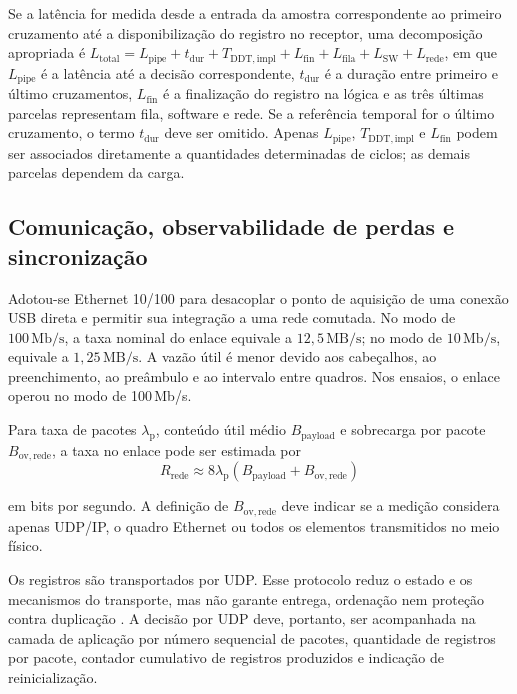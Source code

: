Se a latência for medida desde a entrada da amostra correspondente ao primeiro cruzamento até a disponibilização do registro no receptor, uma decomposição apropriada é \(L_{\mathrm{total}} = L_{\mathrm{pipe}} + t_{\mathrm{dur}} + T_{\mathrm{DDT,impl}} + L_{\mathrm{fin}} + L_{\mathrm{fila}} + L_{\mathrm{SW}} + L_{\mathrm{rede}}\), em que \(L_{\mathrm{pipe}}\) é a latência até a decisão correspondente, \(t_{\mathrm{dur}}\) é a duração entre primeiro e último cruzamentos, \(L_{\mathrm{fin}}\) é a finalização do registro na lógica e as três últimas parcelas representam fila, software e rede. Se a referência temporal for o último cruzamento, o termo \(t_{\mathrm{dur}}\) deve ser omitido. Apenas \(L_{\mathrm{pipe}}\), \(T_{\mathrm{DDT,impl}}\) e \(L_{\mathrm{fin}}\) podem ser associados diretamente a quantidades determinadas de ciclos; as demais parcelas dependem da carga.

\subsection{Comunicação, observabilidade de perdas e sincronização}
\label{v2:subsec:interface_comunicacao}

Adotou-se Ethernet 10/100 para desacoplar o ponto de aquisição de uma conexão USB direta e permitir sua integração a uma rede comutada. No modo de \(100\,\mathrm{Mb/s}\), a taxa nominal do enlace equivale a \(12{,}5\,\mathrm{MB/s}\); no modo de \(10\,\mathrm{Mb/s}\), equivale a \(1{,}25\,\mathrm{MB/s}\). A vazão útil é menor devido aos cabeçalhos, ao preenchimento, ao preâmbulo e ao intervalo entre quadros. Nos ensaios, o enlace operou no modo de 100\,Mb/s. 

Para taxa de pacotes \(\lambda_{\mathrm{p}}\), conteúdo útil médio \(B_{\mathrm{payload}}\) e sobrecarga por pacote \(B_{\mathrm{ov,rede}}\), a taxa no enlace pode ser estimada por 
\begin{equation}
	R_{\mathrm{rede}} \approx 8\lambda_{\mathrm{p}} \left(B_{\mathrm{payload}} + B_{\mathrm{ov,rede}}\right)
	\label{v2:eq:taxa_rede}
\end{equation}

\noindent
em bits por segundo. A definição de \(B_{\mathrm{ov,rede}}\) deve indicar se a medição considera apenas UDP/IP, o quadro Ethernet ou todos os elementos transmitidos no meio físico.

Os registros são transportados por UDP. Esse protocolo reduz o estado e os mecanismos do transporte, mas não garante entrega, ordenação nem proteção contra duplicação \cite{postel1980udp}. A decisão por UDP deve, portanto, ser acompanhada na camada de aplicação por número sequencial de pacotes, quantidade de registros por pacote, contador cumulativo de registros produzidos e indicação de reinicialização. 

